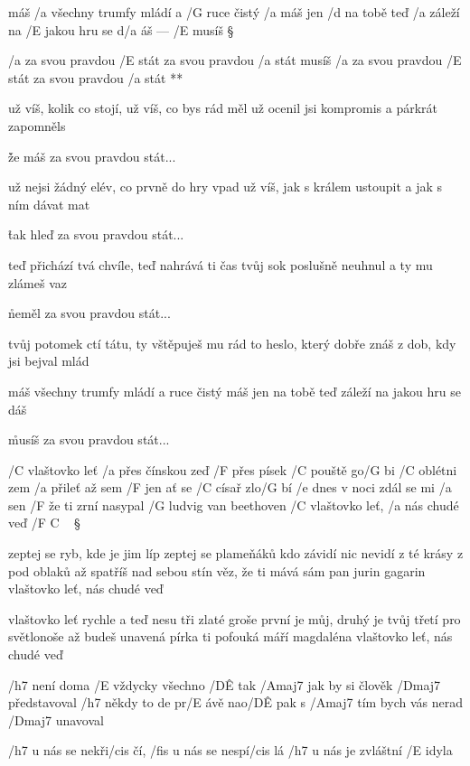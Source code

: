 
máš /a všechny trumfy mládí a /G ruce čistý /a máš
jen /d na tobě teď /a záleží na /E jakou hru se d/a áš --- /E musíš \S

\R /a za svou pravdou /E stát
   za svou pravdou /a stát
   musíš /a za svou pravdou /E stát
   za svou pravdou /a stát **

už víš, kolik co stojí, už víš, co bys rád měl
už ocenil jsi kompromis a párkrát zapomněls \s

\r že máš za svou pravdou stát...

už nejsi žádný elév, co prvně do hry vpad
už víš, jak s králem ustoupit a jak s ním dávat mat \s

\r tak hleď za svou pravdou stát...

teď přichází tvá chvíle, teď nahrává ti čas
tvůj  sok poslušně neuhnul a ty  mu zlámeš vaz \s

\r neměl za svou pravdou stát...

tvůj potomek ctí tátu, ty vštěpuješ mu rád
to heslo, který dobře znáš z dob, kdy jsi bejval mlád \s

máš všechny trumfy mládí a ruce čistý máš
jen na tobě teď záleží na jakou hru se dáš \s

\r musíš za svou pravdou stát...




/C vlaštovko leť /a přes čínskou zeď
/F přes písek /C pouště go/G bi
/C oblétni zem /a přileť až sem
/F jen ať se /C císař zlo/G bí
/e dnes v noci zdál se mi /a sen
/F že ti zrní nasypal /G ludvig van beethoven
/C vlaštovko leť, /a nás chudé veď /{F C} {\ } \S

zeptej se ryb, kde je jim líp
zeptej se plameňáků
kdo závidí nic nevidí
z té krásy z pod oblaků
až spatříš nad sebou stín
věz, že ti mává sám pan jurin gagarin
vlaštovko leť, nás chudé veď \s

vlaštovko leť rychle a teď
nesu tři zlaté groše
první je můj, druhý je tvůj
třetí pro světlonoše
až budeš unavená
pírka ti pofouká máří magdaléna
vlaštovko leť, nás chudé veď \s




/h7 není doma /E vždycky všechno /D\^E tak
/Amaj7 jak by si člověk /Dmaj7 představoval
/h7 někdy to de pr/E ávě nao/D\^E pak
s /Amaj7 tím bych vás nerad /Dmaj7 unavoval

\R  /h7 u nás se nekři/cis čí, /fis u nás se nespí/cis lá
    /h7 u nás je zvláštní /E idyla

